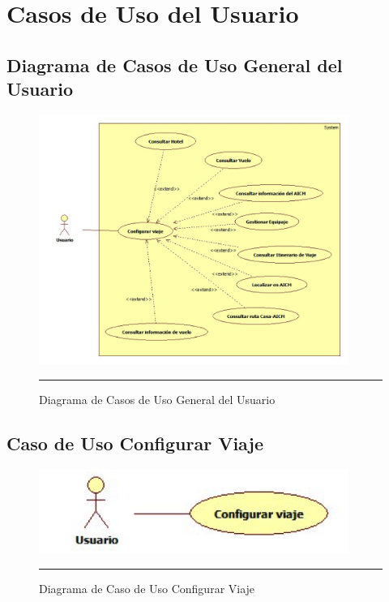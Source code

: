 \section{Casos de Uso del Usuario}

\subsection{Diagrama de Casos de Uso General del Usuario}

\begin{figure}[htbp]
	\centering
		\includegraphics[width=0.9\textwidth]{Figuras/cugeneralUsuario.png}
		\rule{30em}{0.5pt}
	\caption[Diagrama de Casos de Uso General del Usuario]{Diagrama de Casos de Uso General del Usuario}
	\label{fig:cuGeneralUsuario}
\end{figure}

\subsection{Caso de Uso Configurar Viaje}

\begin{figure}[htbp]
	\centering
		\includegraphics[width=0.9\textwidth]{Figuras/cuConfigurarViaje.png}
		\rule{30em}{0.5pt}
	\caption[Diagrama de Caso de Uso Configurar Viaje]{Diagrama de Caso de Uso Configurar Viaje}
	\label{fig:cuConfigurarViaje}
\end{figure}

